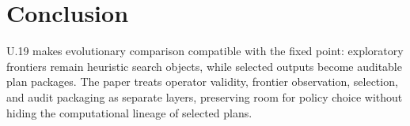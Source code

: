 \section{Conclusion}

U.19 makes evolutionary comparison compatible with the fixed point: exploratory
frontiers remain heuristic search objects, while selected outputs become
auditable plan packages. The paper treats operator validity,
frontier observation, selection, and audit packaging as separate layers,
preserving room for policy choice without hiding the computational lineage of
selected plans.

